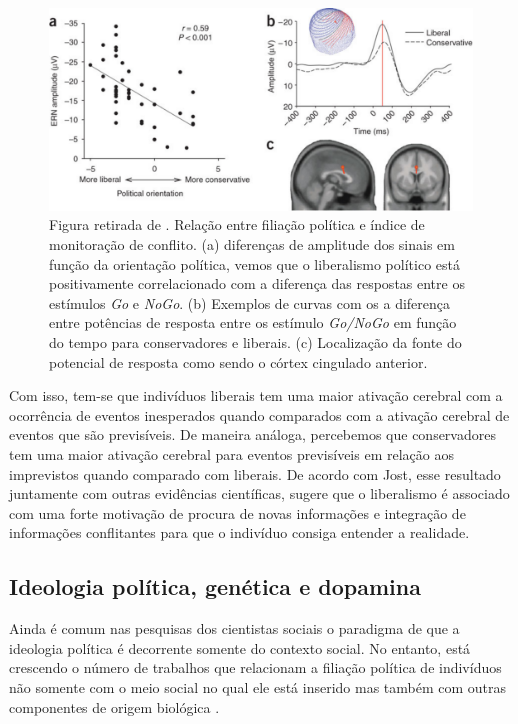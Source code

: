 \begin{figure}
    \includegraphics[width=\linewidth]{Figures/amodio} 
    \caption{
        Figura retirada de \citep{Amodio2007}. Relação entre filiação
        política e índice de monitoração de conflito.  (a) diferenças
        de amplitude dos sinais em função da orientação política,
        vemos que o liberalismo político está positivamente correlacionado
        com a diferença das respostas entre os estímulos \textit{Go}
        e \textit{NoGo}. (b) Exemplos de curvas com os a diferença entre
        potências de resposta entre os  estímulo \textit{Go/NoGo} em função
        do tempo para conservadores e liberais. (c) Localização da fonte
        do potencial de resposta como sendo o córtex cingulado anterior.
    } 
    \label{fig:amodio}
\end{figure}

Com isso, tem-se que indivíduos liberais tem uma maior ativação
cerebral com a ocorrência de eventos inesperados quando comparados com a
ativação cerebral de eventos que são previsíveis. De maneira análoga,
percebemos que conservadores tem uma maior ativação cerebral para eventos
previsíveis em relação aos imprevistos quando comparado com liberais.
De acordo com Jost\citep{Jost2011}, esse resultado juntamente com outras
evidências científicas, sugere que o liberalismo é associado com uma forte
motivação de procura de novas informações e integração de informações
conflitantes para que o indivíduo consiga entender a realidade.

\subsection{Ideologia política, genética e dopamina} %

Ainda é comum nas pesquisas dos cientistas sociais o paradigma de que a
ideologia política é decorrente somente do contexto social. No entanto,
está crescendo o número de trabalhos que relacionam a filiação
política de indivíduos não somente com o meio social no qual ele
está inserido mas também com outras componentes de origem biológica
\citep{Fowler2008,Dawes2009,Settle2010,Hatemi2011}.

